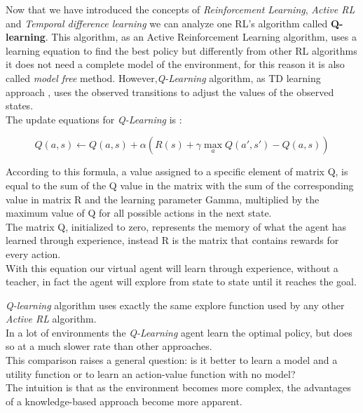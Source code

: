\documentclass[]{report}
\begin{document}
Now that we have introduced the concepts of \emph{Reinforcement Learning}, \emph{Active RL} and \emph{Temporal difference learning} we can analyze one RL's algorithm called \textbf{Q-learning}.
This algorithm, as an Active Reinforcement Learning algorithm, uses a learning equation to find the best policy but differently from other RL algorithms it does not need a complete model of the environment, for this reason it is also called \emph{model free} method.
However,\emph{Q-Learning} algorithm, as TD learning approach , uses the observed transitions to adjust the values of the observed states.\\ The update equations for \emph{Q-Learning} is :

\begin{equation*}
		Q(a,s) \leftarrow Q(a,s) + \alpha (R(s) + \gamma \max_a Q(a',s')-Q(a,s))
\end{equation*}

According to this formula, a value assigned to a specific element of matrix Q, is equal to the sum of the Q value in the matrix with the sum of the corresponding value in matrix R and the learning parameter Gamma, multiplied by the maximum value of Q for all possible actions in the next state.\\
The matrix Q, initialized to zero, represents the memory of what the agent has learned through experience, instead R is the matrix that contains rewards for every action.\\
With this equation our virtual agent will learn through experience, without a teacher, in fact the agent will explore from state to state until it reaches the goal.

\emph{Q-learning} algorithm uses exactly the same explore function used by any other \emph{Active RL} algorithm.\\
In a lot of environments the \emph{Q-Learning} agent learn the optimal policy, but does so at a much slower rate than other approaches.\\
This comparison raises a general question: is it better to learn a model and a utility function or to learn an action-value function with no model?\\
The intuition is that as the environment becomes more complex, the advantages of a knowledge-based approach become more apparent.

\newpage
\end{document}
